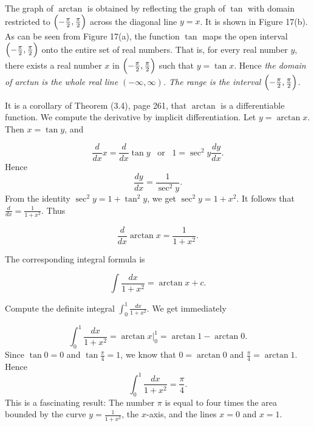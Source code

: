 The graph of $\arctan$ is obtained by reflecting the graph of $\tan$ with domain restricted to 
$\Bigl( -\frac{\pi}{2}, \frac{\pi}{2}\Bigr)$ across the diagonal line $y = x$. It is shown in Figure 17(b). 
As can be seen from Figure 17(a), the function $\tan$ maps the open interval $\Bigl( -\frac{\pi}{2}, \frac{\pi}{2}\Bigr )$ onto the entire set of real numbers.  That is, for every real number $y$, 
there exists a real number $x$ in $\Bigl( -\frac{\pi}{2}, \frac{\pi}{2} \Bigr)$ such that $y = \tan x$.  
Hence \textit{the domain of arctun is the whole real line $( -\infty, \infty)$. The range is the interval 
$\Bigl( -\frac{\pi}{2}, \frac{\pi}{2}\Bigr)$.}


It is a corollary of Theorem (3.4), page 261, that $\arctan$ is a differentiable function. 
We compute the derivative by implicit differentiation. Let $y = \arctan x$.  Then $x = \tan y$, and

$$
\frac{d}{dx} x = \frac{d}{dx} \tan y \;\;\;\mbox{or}\;\;\; 1 = \sec^{2}y \frac{dy}{dx}.
$$
Hence
$$
\frac{dy}{dx} = \frac{1}{\sec^{2} y}. 
$$
From the identity $\sec^{2} y = 1 + \tan^{2} y$, we get $\sec^{2} y = 1 + x^{2}$. 
It follows that $\frac{d}{dx} = \frac{1}{1 + x^2}$. Thus  

\begin{theorem} %
$$
\frac{d}{dx} \arctan x = \frac{1}{1 + x^{2}}.
$$\end{theorem}

The corresponding integral formula is

\begin{theorem} %
$$ 
\int \frac{dx}{1 + x^2} = \arctan x + c .
$$
\end{theorem}

\begin{example} Compute the definite integral $\int_{0}^{1} \frac{dx}{1 + x^2}$. We get immediately

$$
\int_{0}^{1} \frac{dx}{1 + x^2} = \arctan x \big |_{0}^{1} = \arctan 1 - \arctan 0.
$$
Since $\tan 0 = 0$ and $\tan \frac{\pi}{4} = 1$, we know that $0 = \arctan 0$ 
and $\frac{\pi}{4} = \arctan 1$.  Hence 
$$
\int_{0}^{1} \frac{dx}{1 + x^2} = \frac{\pi}{4}.
$$
This is a fascinating result: The number $\pi$ is equal to four times the area bounded by the curve $y = \frac{1}{1 + x^2}$, the $x$-axis, and the lines $x= 0$ and $x = 1$.
\end{example}

